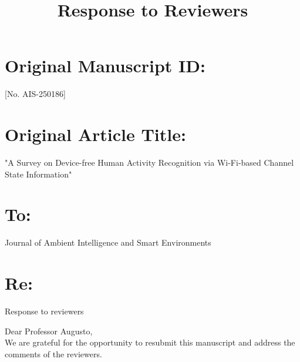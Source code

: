 \documentclass[Afour,sageh,times]{sagej}
\begin{document}

\onecolumn
\title{Response to Reviewers}
\date{}
\maketitle









\section*{Original Manuscript ID: }  [No. AIS-250186]
\section*{Original Article Title: }  "A Survey on Device-free Human Activity Recognition via Wi-Fi-based Channel State Information"


\section*{To: }Journal of Ambient Intelligence and Smart Environments

\section*{Re: }Response to reviewers \\
\bigskip


\noindent Dear Professor Augusto, \\
  
We are grateful for the opportunity to resubmit this manuscript and address the comments of the reviewers.
\end{document}
